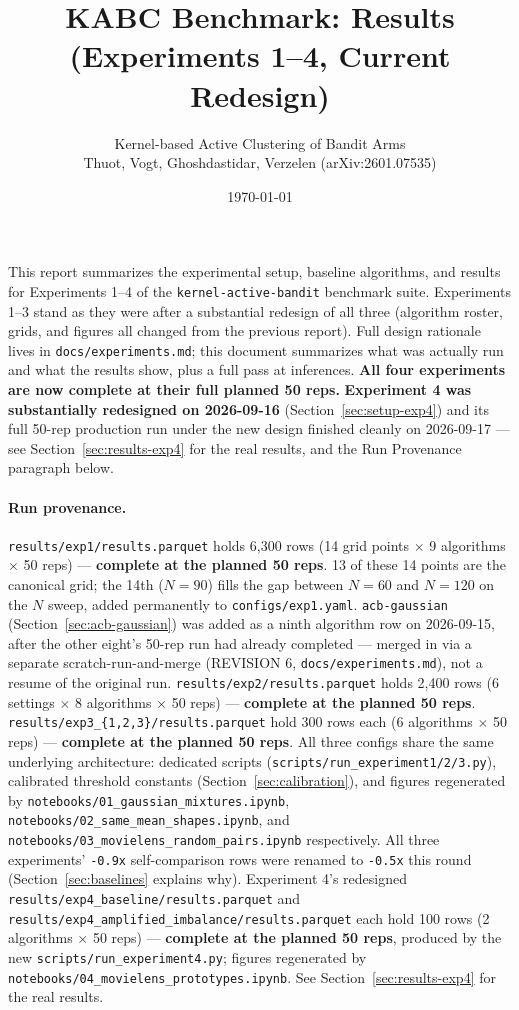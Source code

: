 \documentclass[11pt]{article}
\title{KABC Benchmark: Results (Experiments 1--4, Current Redesign)}
\author{Kernel-based Active Clustering of Bandit Arms\\
\small Thuot, Vogt, Ghoshdastidar, Verzelen (arXiv:2601.07535)}
\date{\today}
\begin{document}
\maketitle

\noindent This report summarizes the experimental setup, baseline algorithms,
and results for Experiments 1--4 of the \texttt{kernel-active-bandit}
benchmark suite. Experiments 1--3 stand as they were after a substantial
redesign of all three (algorithm roster, grids, and figures all changed from
the previous report). Full design rationale lives in
\texttt{docs/experiments.md}; this document summarizes what was actually run
and what the results show, plus a full pass at inferences. \textbf{All four
experiments are now complete at their full planned 50 reps.}
\textbf{Experiment 4 was substantially redesigned on 2026-09-16}
(Section~\ref{sec:setup-exp4}) and its full 50-rep production run under the
new design finished cleanly on 2026-09-17 --- see
Section~\ref{sec:results-exp4} for the real results, and the Run Provenance
paragraph below.

\paragraph{Run provenance.} \texttt{results/exp1/results.parquet} holds
6{,}300 rows (14 grid points $\times$ 9 algorithms $\times$ 50 reps) ---
\textbf{complete at the planned 50 reps}. 13 of these 14 points are the
canonical grid; the 14th ($N=90$) fills the gap between $N{=}60$ and
$N{=}120$ on the $N$ sweep, added permanently to \texttt{configs/exp1.yaml}.
\texttt{acb-gaussian} (Section~\ref{sec:acb-gaussian}) was added as a
ninth algorithm row on 2026-09-15, after the other eight's 50-rep run had
already completed --- merged in via a separate scratch-run-and-merge
(REVISION 6, \texttt{docs/experiments.md}), not a resume of the original
run.
\texttt{results/exp2/results.parquet} holds 2{,}400 rows (6 settings
$\times$ 8 algorithms $\times$ 50 reps) --- \textbf{complete at the planned
50 reps}. \texttt{results/exp3\_\{1,2,3\}/results.parquet} hold 300 rows each
(6 algorithms $\times$ 50 reps) --- \textbf{complete at the planned 50 reps}.
All three configs share the same underlying architecture: dedicated scripts
(\texttt{scripts/run\_experiment1/2/3.py}), calibrated threshold constants
(Section~\ref{sec:calibration}), and figures regenerated by
\texttt{notebooks/01\_gaussian\_mixtures.ipynb},
\texttt{notebooks/02\_same\_mean\_shapes.ipynb}, and
\texttt{notebooks/03\_movielens\_random\_pairs.ipynb} respectively. All three
experiments' \texttt{-0.9x} self-comparison rows were renamed to
\texttt{-0.5x} this round (Section~\ref{sec:baselines} explains why).
Experiment 4's redesigned \texttt{results/exp4\_baseline/results.parquet}
and \texttt{results/exp4\_amplified\_imbalance/results.parquet} each hold
100 rows (2 algorithms $\times$ 50 reps) --- \textbf{complete at the
planned 50 reps}, produced by the new \texttt{scripts/run\_experiment4.py};
figures regenerated by \texttt{notebooks/04\_movielens\_prototypes.ipynb}.
See Section~\ref{sec:results-exp4} for the real results.
\end{document}
